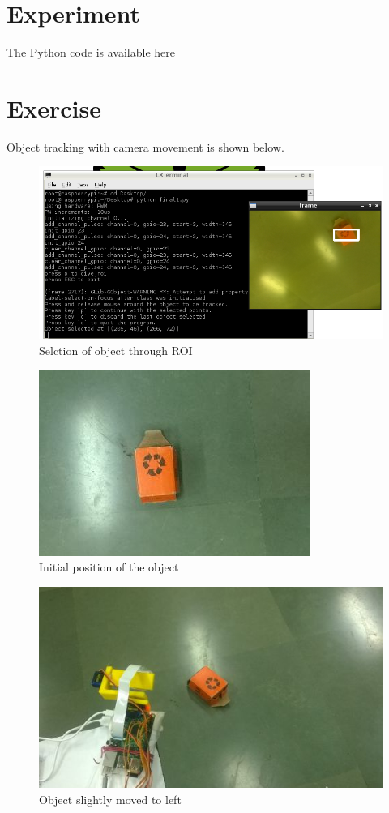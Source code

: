 \documentclass[11pt,a4paper]{article}
\begin{document}
	\section{Experiment}
	The Python code is available \href{}{here}
  	
 \newpage
	\section{Exercise}
	Object tracking with camera movement is shown below.
	\begin{figure}[h]
     \includegraphics[scale=0.5]{1.png}
   \centering
 \caption{Selction of object through ROI}
  \end{figure}
  \begin{figure}[h]
 \includegraphics[scale=0.5]{s1.jpg}
   \centering
 \caption{Initial position of the object}
  \end{figure}
  \begin{figure}[h]
 \includegraphics[scale=0.5]{s2.jpg}
   \centering
 \caption{Object slightly moved to left}
  \end{figure}
\end{document}
